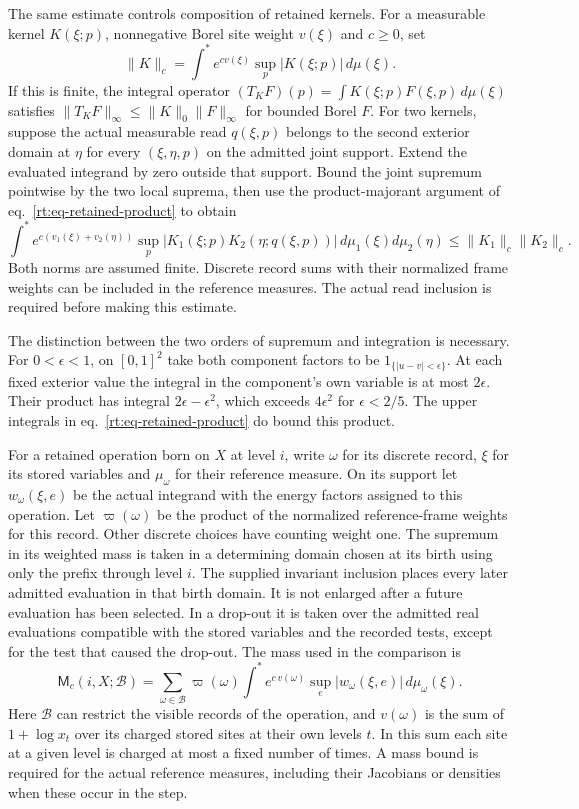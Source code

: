 \documentclass[11pt,letterpaper,reqno]{amsart}
\numberwithin{equation}{section}
\renewcommand{\eqref}[1]{\textup{eq.~\ref{#1}}}
\theoremstyle{definition}
\theoremstyle{remark}
\begin{document}
The same estimate controls composition of retained kernels.
For a measurable kernel $K(\xi;p)$, nonnegative Borel site weight
$v(\xi)$ and $c\ge0$, set
\[
 \|K\|_c=\int^*e^{c v(\xi)}\sup_p|K(\xi;p)|\,d\mu(\xi).
\]
If this is finite, the integral operator
$(T_KF)(p)=\int K(\xi;p)F(\xi,p)\,d\mu(\xi)$ satisfies
$\|T_K F\|_\infty\le\|K\|_0\|F\|_\infty$ for bounded Borel $F$.
For two kernels, suppose the actual measurable read $q(\xi,p)$
belongs to the second exterior domain at $\eta$ for every
$(\xi,\eta,p)$ on the admitted joint support. Extend the evaluated
integrand by zero outside that support.
Bound the joint supremum pointwise by the two local suprema,
then use the product-majorant argument of
\eqref{rt:eq-retained-product} to obtain
\[
 \int^* e^{c(v_1(\xi)+v_2(\eta))}
  \sup_p |K_1(\xi;p)K_2(\eta;q(\xi,p))|
                 \,d\mu_1(\xi)d\mu_2(\eta)
       \le \|K_1\|_c\|K_2\|_c.
\]
Both norms are assumed finite. Discrete record sums with their
normalized frame weights can be included in the reference measures.
The actual read inclusion is required before making this estimate.

The distinction between the two orders of supremum and integration
is necessary. For \(0<\epsilon<1\), on \([0,1]^2\) take both
component factors to be \(1_{\{|u-v|<\epsilon\}}\). At each fixed
exterior value the integral in the component's own variable is at
most \(2\epsilon\). Their product has integral
\(2\epsilon-\epsilon^2\), which exceeds \(4\epsilon^2\) for
\(\epsilon<2/5\). The upper integrals in
\eqref{rt:eq-retained-product} do bound this product.

For a retained operation born on \(X\) at level \(i\), write
\(\omega\) for its discrete record, \(\xi\) for its stored
variables and \(\mu_\omega\) for their reference measure. On its
support let \(w_\omega(\xi,e)\) be the actual integrand with the
energy factors assigned to this operation. Let \(\varpi(\omega)\)
be the product of the normalized reference-frame weights for this
record. Other discrete choices have counting weight one. The
supremum in its weighted mass is taken in a determining domain
chosen at its birth using only the prefix through level $i$.
The supplied invariant inclusion places every later admitted
evaluation in that birth domain. It is not enlarged after a
future evaluation has been selected.
In a drop-out it is taken over the admitted real evaluations
compatible with the stored variables and the recorded tests,
except for the test that caused the drop-out. The mass used in the
comparison is
\begin{equation}\label{rt:eq-weighted-retained-mass}
   \mathsf M_c(i,X;\mathcal B)=
   \sum_{\omega\in\mathcal B} \varpi(\omega)
      \int^* e^{c\,v(\omega)}
         \sup_e |w_\omega(\xi,e)|\,d\mu_\omega(\xi).
\end{equation}
Here \(\mathcal B\) can restrict the visible records of the
operation, and \(v(\omega)\) is the sum of
\(1+\log x_t\) over its charged stored sites at their own levels
\(t\). In this sum each site at a given level is charged at most a
fixed number of times. A mass bound is required for the actual
reference measures, including their Jacobians or densities when
these occur in the step.
\end{document}
